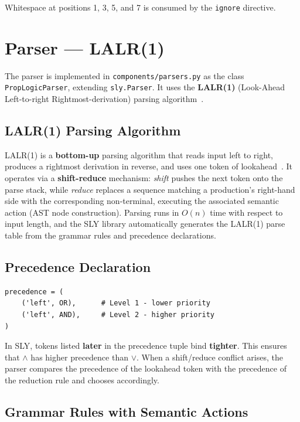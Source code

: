 Whitespace at positions 1, 3, 5, and 7 is consumed by the \texttt{ignore} directive.

\section{Parser --- LALR(1)}

The parser is implemented in \texttt{components/parsers.py} as the class \texttt{PropLogicParser}, extending \texttt{sly.Parser}. It uses the \textbf{LALR(1)} (Look-Ahead Left-to-right Rightmost-derivation) parsing algorithm~\citep{aho2006compilers}.

\subsection{LALR(1) Parsing Algorithm}

LALR(1) is a \textbf{bottom-up} parsing algorithm that reads input left to right, produces a rightmost derivation in reverse, and uses one token of lookahead~\citep{aho2006compilers}.  It operates via a \textbf{shift-reduce} mechanism: \emph{shift} pushes the next token onto the parse stack, while \emph{reduce} replaces a sequence matching a production's right-hand side with the corresponding non-terminal, executing the associated semantic action (AST node construction).  Parsing runs in $O(n)$ time with respect to input length, and the SLY library automatically generates the LALR(1) parse table from the grammar rules and precedence declarations.

\subsection{Precedence Declaration}

\begin{lstlisting}[caption={Precedence declaration in \texttt{PropLogicParser}}, label={lst:precedence}]
precedence = (
    ('left', OR),      # Level 1 - lower priority
    ('left', AND),     # Level 2 - higher priority
)
\end{lstlisting}

In SLY, tokens listed \textbf{later} in the precedence tuple bind \textbf{tighter}. This ensures that $\wedge$ has higher precedence than $\vee$. When a shift/reduce conflict arises, the parser compares the precedence of the lookahead token with the precedence of the reduction rule and chooses accordingly.

\subsection{Grammar Rules with Semantic Actions}

